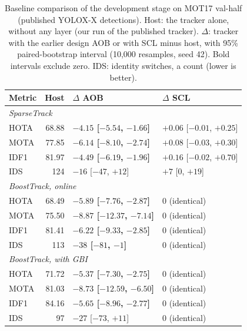 \begin{table}[tbp]
\centering
\caption{Baseline comparison of the development stage on MOT17 val-half (published YOLOX-X detections). Host: the tracker alone, without any layer (our run of the published tracker). $\Delta$: tracker with the earlier design AOB or with SCL minus host, with 95\% paired-bootstrap interval (10,000 resamples, seed 42). Bold intervals exclude zero. IDS: identity switches, a count (lower is better).}
\label{tab:scl-prior}
\begin{tabular}{lrll}
\toprule
Metric & Host & $\Delta$ AOB & $\Delta$ SCL\\
\midrule
\multicolumn{4}{l}{\textit{SparseTrack} \cite{liu2025sparsetrack}}\\
\quad HOTA & 68.88 & \textbf{$-4.15$ [$-5.54$, $-1.66$]} & $+0.06$ [$-0.01$, $+0.25$]\\
\quad MOTA & 77.85 & \textbf{$-6.14$ [$-8.10$, $-2.74$]} & $+0.08$ [$-0.03$, $+0.30$]\\
\quad IDF1 & 81.97 & \textbf{$-4.49$ [$-6.19$, $-1.96$]} & $+0.16$ [$-0.02$, $+0.70$]\\
\quad IDS & 124 & $-16$ [$-47$, $+12$] & $+7$ [$0$, $+19$]\\
\multicolumn{4}{l}{\textit{BoostTrack, online} \cite{stanojevic2024boosttrack}}\\
\quad HOTA & 68.49 & \textbf{$-5.89$ [$-7.76$, $-2.87$]} & 0 (identical)\\
\quad MOTA & 75.50 & \textbf{$-8.87$ [$-12.37$, $-7.14$]} & 0 (identical)\\
\quad IDF1 & 81.41 & \textbf{$-6.22$ [$-9.33$, $-2.85$]} & 0 (identical)\\
\quad IDS & 113 & \textbf{$-38$ [$-81$, $-1$]} & 0 (identical)\\
\multicolumn{4}{l}{\textit{BoostTrack, with GBI} \cite{stanojevic2024boosttrack}}\\
\quad HOTA & 71.72 & \textbf{$-5.37$ [$-7.30$, $-2.75$]} & 0 (identical)\\
\quad MOTA & 81.03 & \textbf{$-8.73$ [$-12.59$, $-6.50$]} & 0 (identical)\\
\quad IDF1 & 84.16 & \textbf{$-5.65$ [$-8.96$, $-2.77$]} & 0 (identical)\\
\quad IDS & 97 & $-27$ [$-73$, $+11$] & 0 (identical)\\
\bottomrule
\end{tabular}
\end{table}

